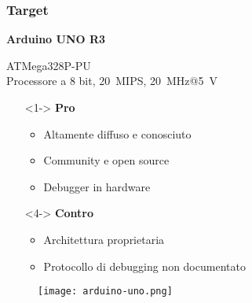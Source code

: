 \documentclass[aspectratio=169,
]{beamer}
\begin{document}
    \begin{frame}
        \frametitle{Target}
    
        \begin{minipage}{.5\textwidth}
            \textbf{Arduino UNO R3}

            ATMega328P-PU\\{\footnotesize Processore a 8 bit, \SI{20}{MIPS}, \SI{20}{\mega\hertz}@\SI{5}{\volt}}\cite{avr:m328p}

            \begin{itemize}
                \item []<1-> \textbf{Pro}
                \begin{itemize}
                    \item <2-> Altamente diffuso e conosciuto\cite{site:arduino-uno-doc}
                    \item <3-> Community e open source
                    \item <4-> Debugger in hardware
                \end{itemize}
                \item []<4-> \textbf{Contro}
                \begin{itemize}
                    \item <5-> Architettura proprietaria
                    \item <6-> Protocollo di debugging non documentato\cite{site:dw-reverse-engeneering}
                \end{itemize}
            \end{itemize}            
        \end{minipage}
        \begin{minipage}{.48\textwidth}
            \begin{figure}
                \texttt{[image: arduino-uno.png]}
            \end{figure}    
        \end{minipage}
    \end{frame}
\end{document}
